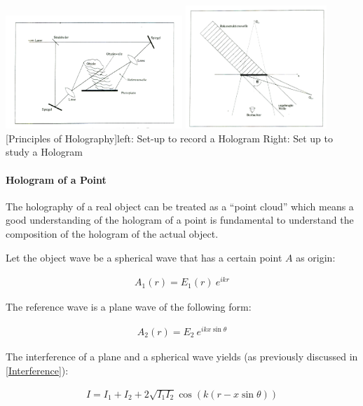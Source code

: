 \begin{minipage}{\textwidth}
	\centering
	\includegraphics[width=0.5\textwidth]{../figures/holo1}
	\includegraphics[width=0.4\textwidth]{../figures/holo2}
	[Principles of Holography]{left: Set-up to record a Hologram Right: Set up to study a Hologram }
\end{minipage}\vskip 0.5cm



\paragraph{Hologram of a Point}

The holography of a real object can be treated as a ``point cloud'' which means a good understanding of the hologram of a point is fundamental to understand the composition of the hologram of the actual object. 

Let the object wave be a spherical wave that has a certain point $A$ as origin:


\begin{align}
A_1(r)=E_1(r) \ e^{ikr}
\end{align}


The reference wave is a plane wave of the following form:

\begin{align}
A_2(r)=E_2\ e^{ikx \sin\theta} 
\end{align}


The interference of a plane and a spherical wave yields (as previously discussed in \ref{Interference}):

\begin{align}
I=I_1+I_2+2\sqrt{I_1I_2}\cos(k(r-x\sin\theta))
\end{align}



